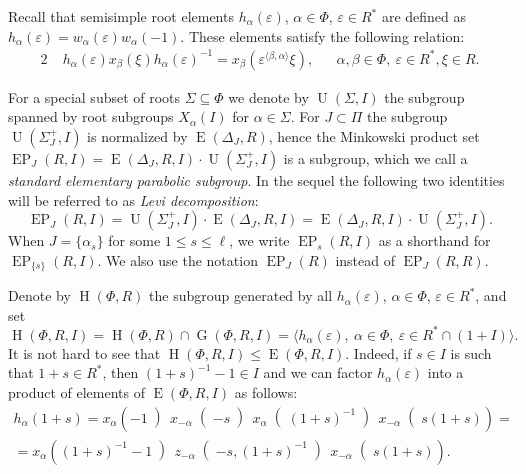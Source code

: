 \documentclass[11pt]{amsart}
\theoremstyle{plain}
\numberwithin{equation}{section}
\numberwithin{lemma}{section}
\theoremstyle{definition}
\theoremstyle{remark}
\DeclareMathOperator{\G}{G}
\DeclareMathOperator{\E}{E}
\DeclareMathOperator{\EP}{EP}
\DeclareMathOperator{\Hh}{H}
\DeclareMathOperator{\U}{U}
\begin{document}
Recall that semisimple root elements $h_\alpha(\varepsilon)$, $\alpha\in\Phi$, $\varepsilon\in R^*$ are defined as $h_\alpha(\varepsilon)=w_\alpha(\varepsilon)w_\alpha(-1)$.
These elements satisfy the following relation:
\begin{alignat}{2} 
& \phantom{[} h_\alpha(\varepsilon)x_\beta(\xi)h_\alpha(\varepsilon)^{-1} = x_\beta\left(\varepsilon^{\langle\beta, \alpha\rangle}\xi\right), && \alpha, \beta \in \Phi, \ \varepsilon \in R^*, \xi \in R. \label{rel:h-w}
\end{alignat}

For a special subset of roots $\Sigma\subseteq \Phi$ we denote by $\U(\Sigma, I)$ the subgroup spanned by root subgroups $X_{\alpha}(I)$ for $\alpha\in \Sigma$. 
For $J\subset\Pi$ the subgroup $\U(\Sigma_J^+, I)$ is normalized by $\E(\Delta_J, R)$, hence the Minkowski product set $\EP_J(R, I) = \E(\Delta_J, R, I) \cdot \U(\Sigma_J^+, I)$ is a subgroup, which we call a \emph{standard elementary parabolic subgroup}.
In the sequel the following two identities will be referred to as \emph{Levi decomposition}:
\begin{equation} \label{rel:Levi-decomp} \EP_J(R, I) = \U(\Sigma_J^+, I) \cdot \E(\Delta_J, R, I) = \E(\Delta_J, R, I) \cdot \U(\Sigma_J^+, I). \end{equation}
When $J = \{ \alpha_s \}$ for some $1 \leq s\leq \ell$, we write $\EP_s(R, I)$ as a shorthand for $\EP_{\{s\}}(R, I)$.
We also use the notation $\EP_J(R)$ instead of $\EP_J(R, R)$.

Denote by $\Hh(\Phi, R)$ the subgroup generated by all $h_\alpha(\varepsilon)$, $\alpha\in\Phi$, $\varepsilon\in R^*$, and set
\[ \Hh(\Phi, R, I) = \Hh(\Phi, R)\cap\G(\Phi, R, I)=\langle h_\alpha(\varepsilon), \ \alpha\in\Phi, \ \varepsilon\in R^*\cap(1+I)\rangle. \]
It is not hard to see that $\Hh(\Phi, R, I) \leqslant \E(\Phi, R, I)$.
Indeed, if $s\in I$ is such that $1+s\in R^*$, then $(1+s)^{-1}-1 \in I$ and we can factor $h_\alpha(\varepsilon)$ into a product of elements of $\E(\Phi, R, I)$ as follows:
\begin{multline} \label{eq:rel-tor-elementary}
h_\alpha(1+s) = x_\alpha\left(-1\middle)\, x_{-\alpha}\middle(-s\middle)\, x_\alpha\middle((1+s)^{-1}\middle)\, x_{-\alpha}\middle(s(1+s)\right) = \\
= x_\alpha\left((1+s)^{-1}-1\middle)\, z_{-\alpha}\middle(-s, (1+s)^{-1}\middle)\, x_{-\alpha}\middle(s(1+s)\right).
\end{multline}
\end{document}
